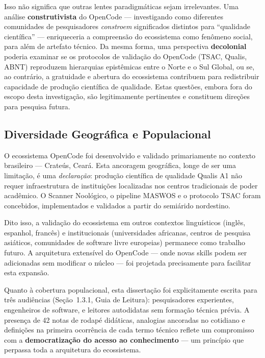 Isso não significa que outras lentes paradigmáticas sejam irrelevantes. Uma análise \textbf{construtivista} do OpenCode --- investigando como diferentes comunidades de pesquisadores \textit{constroem} significados distintos para ``qualidade científica'' --- enriqueceria a compreensão do ecossistema como fenômeno social, para além de artefato técnico. Da mesma forma, uma perspectiva \textbf{decolonial} poderia examinar se os protocolos de validação do OpenCode (TSAC, Qualis, ABNT) reproduzem hierarquias epistêmicas entre o Norte e o Sul Global, ou se, ao contrário, a gratuidade e abertura do ecossistema contribuem para redistribuir capacidade de produção científica de qualidade. Estas questões, embora fora do escopo desta investigação, são legitimamente pertinentes e constituem direções para pesquisa futura.

\subsection{Diversidade Geográfica e Populacional}

O ecossistema OpenCode foi desenvolvido e validado primariamente no contexto brasileiro --- Crateús, Ceará. Esta ancoragem geográfica, longe de ser uma limitação, é uma \textit{declaração}: produção científica de qualidade Qualis A1 não requer infraestrutura de instituições localizadas nos centros tradicionais de poder acadêmico. O Scanner Noológico, o pipeline MASWOS e o protocolo TSAC foram concebidos, implementados e validados a partir do semiárido nordestino.

Dito isso, a validação do ecossistema em outros contextos linguísticos (inglês, espanhol, francês) e institucionais (universidades africanas, centros de pesquisa asiáticos, comunidades de software livre europeias) permanece como trabalho futuro. A arquitetura extensível do OpenCode --- onde novas skills podem ser adicionadas sem modificar o núcleo --- foi projetada precisamente para facilitar esta expansão.

Quanto à cobertura populacional, esta dissertação foi explicitamente escrita para três audiências (Seção~1.3.1, Guia de Leitura): pesquisadores experientes, engenheiros de software, e leitores autodidatas sem formação técnica prévia. A presença de 42 notas de rodapé didáticas, analogias ancoradas no cotidiano e definições na primeira ocorrência de cada termo técnico reflete um compromisso com a \textbf{democratização do acesso ao conhecimento} --- um princípio que perpassa toda a arquitetura do ecossistema.

